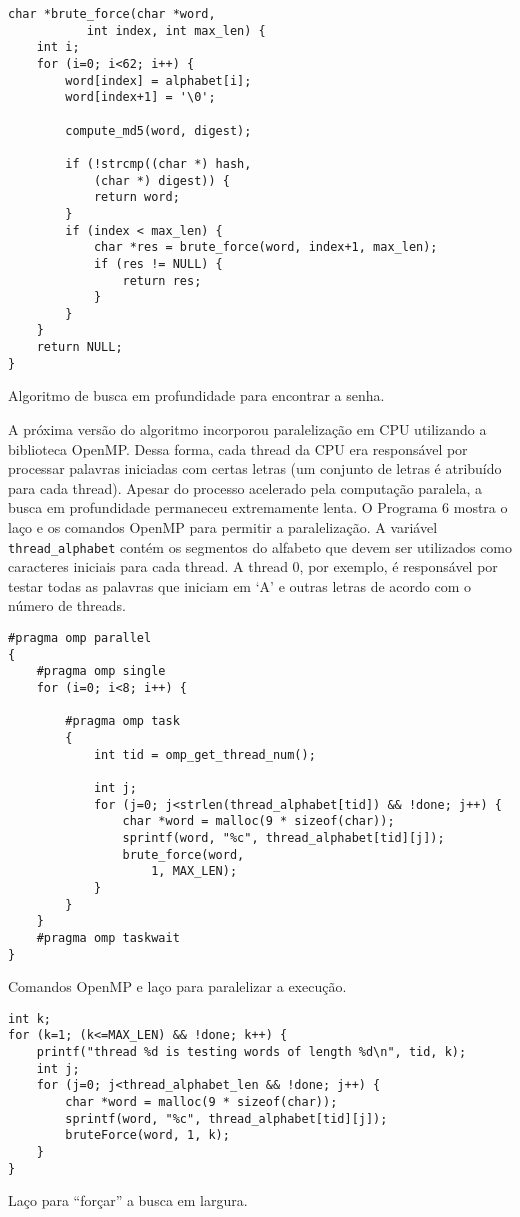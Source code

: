 \documentclass{sig-alternate-05-2015}
\begin{document}
\begin{program}
\begin{lstlisting}
char *brute_force(char *word, 
           int index, int max_len) {
    int i;
    for (i=0; i<62; i++) {
        word[index] = alphabet[i];
        word[index+1] = '\0';

        compute_md5(word, digest);

        if (!strcmp((char *) hash,
        	(char *) digest)) {
            return word;
        }
        if (index < max_len) {
            char *res = brute_force(word, index+1, max_len);
            if (res != NULL) {
                return res;
            }
        }
    }
    return NULL;
}
\end{lstlisting}
\caption{Algoritmo de busca em profundidade para encontrar a senha.}
\end{program}

A próxima versão do algoritmo incorporou paralelização em CPU utilizando a biblioteca OpenMP.
Dessa forma, cada thread da CPU era responsável por processar palavras iniciadas com certas letras (um conjunto de letras é atribuído para cada thread).
Apesar do processo acelerado pela computação paralela, a busca em profundidade permaneceu extremamente lenta.
O Programa 6 mostra o laço e os comandos OpenMP para permitir a paralelização.
A variável \texttt{thread\_alphabet} contém os segmentos do alfabeto que devem ser utilizados como caracteres iniciais para cada thread.
A thread 0, por exemplo, é responsável por testar todas as palavras que iniciam em `A' e outras letras de acordo com o número de threads. 

\begin{program}
\begin{lstlisting}
#pragma omp parallel
{
    #pragma omp single
    for (i=0; i<8; i++) {

        #pragma omp task
        {
            int tid = omp_get_thread_num();

            int j;
            for (j=0; j<strlen(thread_alphabet[tid]) && !done; j++) {
                char *word = malloc(9 * sizeof(char));
                sprintf(word, "%c", thread_alphabet[tid][j]);
                brute_force(word, 
                    1, MAX_LEN);                        
            }
        }
    }
    #pragma omp taskwait
}\end{lstlisting}
\caption{Comandos OpenMP e laço para paralelizar a execução.}
\end{program}

\begin{program}
\begin{lstlisting}
int k;
for (k=1; (k<=MAX_LEN) && !done; k++) {
    printf("thread %d is testing words of length %d\n", tid, k);
    int j;
    for (j=0; j<thread_alphabet_len && !done; j++) {
        char *word = malloc(9 * sizeof(char));
        sprintf(word, "%c", thread_alphabet[tid][j]);
        bruteForce(word, 1, k);                        
    }
}
\end{lstlisting}
\caption{Laço para ``forçar'' a busca em largura.}
\end{program}
\end{document}
